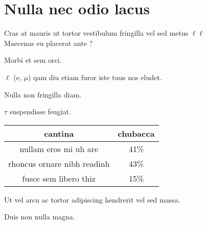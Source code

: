 \section{Nulla nec odio lacus}

	\slideCentered
	{

		Cras at mauris ut tortor vestibulum fringilla vel sed metus $\ell \ell$\\
		Maecenas eu placerat ante ?
	}

	\slide
	{
		Morbi et sem orci.
		\itemList
		{
			\item $\ell$ (e, $\mu$) qam diu etiam furor iste tuus nos eludet.
			\item Nulla non fringilla diam.
			\item $\tau$ suspendisse feugiat.
		}
	}

	\slideCentered
	{
		\begin{tabular}{c|c}
			   cantina					& chubacca \\
			\hline
				    nullam eros mi uh are  	& 41\% \\
					rhoncus ornare nibh readinh  			& 43\% \\
				    fusce sem libero thiz & 15\% \\
		\end{tabular}

		\bigskip
		\itemList
		{
			\item Ut vel arcu ac tortor adipiscing hendrerit vel sed massa.
			\item Duis non nulla magna.
		}
	}
